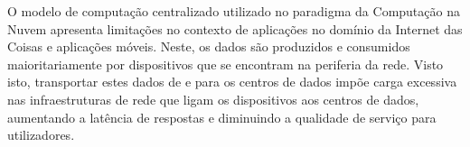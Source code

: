 


O modelo de computação centralizado utilizado no paradigma da Computação na Nuvem apresenta limitações no contexto de aplicações no domínio da Internet das Coisas e aplicações móveis. Neste, os dados são produzidos e consumidos maioritariamente por dispositivos que se encontram na periferia da rede. Visto isto, transportar estes dados de e para os centros de dados impõe carga excessiva nas infraestruturas de rede que ligam os dispositivos aos centros de dados, aumentando a latência de respostas e diminuindo a qualidade de serviço para utilizadores. 

